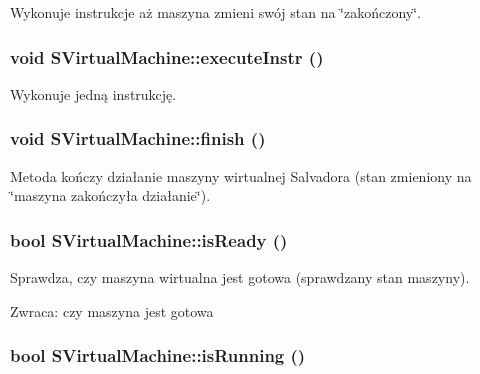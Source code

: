 Wykonuje instrukcje aż maszyna zmieni swój stan na \char`\"{}zakończony\char`\"{}. \hypertarget{classSVirtualMachine_200c4aae4eedf52ba7a3754295505186}{
\subsubsection[{executeInstr}]{\setlength{\rightskip}{0pt plus 5cm}void SVirtualMachine::executeInstr ()}}
\label{classSVirtualMachine_200c4aae4eedf52ba7a3754295505186}


Wykonuje jedną instrukcję. \hypertarget{classSVirtualMachine_5eb2195ecac5f0bed11b2318cf8feed2}{
\subsubsection[{finish}]{\setlength{\rightskip}{0pt plus 5cm}void SVirtualMachine::finish ()}}
\label{classSVirtualMachine_5eb2195ecac5f0bed11b2318cf8feed2}


Metoda kończy działanie maszyny wirtualnej Salvadora (stan zmieniony na \char`\"{}maszyna zakończyła działanie\char`\"{}). \hypertarget{classSVirtualMachine_86dfbb99cbccd36729253cf34835c805}{
\subsubsection[{isReady}]{\setlength{\rightskip}{0pt plus 5cm}bool SVirtualMachine::isReady ()}}
\label{classSVirtualMachine_86dfbb99cbccd36729253cf34835c805}


Sprawdza, czy maszyna wirtualna jest gotowa (sprawdzany stan maszyny). \begin{Desc}
\item[Zwraca:]czy maszyna jest gotowa \end{Desc}
\hypertarget{classSVirtualMachine_09f1f983396791f84947f80097351862}{
\subsubsection[{isRunning}]{\setlength{\rightskip}{0pt plus 5cm}bool SVirtualMachine::isRunning ()}}
\label{classSVirtualMachine_09f1f983396791f84947f80097351862}


